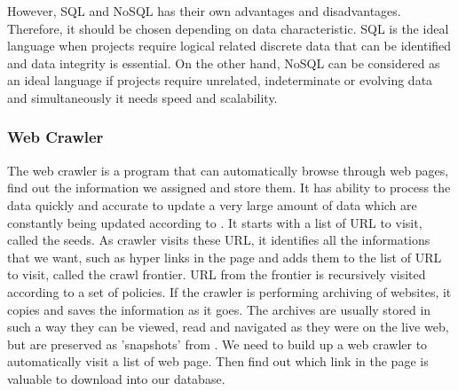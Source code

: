 However, SQL and NoSQL has their own advantages and disadvantages.
Therefore, it should be chosen depending on data characteristic.
SQL is the ideal language when projects require logical related discrete data that can be identified and data integrity is essential.
On the other hand, NoSQL can be considered as an ideal language if projects require unrelated, indeterminate or evolving data and simultaneously it needs speed and scalability.
	
\subsubsection{Web Crawler}
The web crawler is a program that can automatically browse through web pages, find out the information we assigned and store them.
It has ability to process the data quickly and accurate to update a very large amount of data which are constantly being updated according to \cite{Liu2012}.
It starts with a list of URL to visit, called the seeds.
As crawler visits these URL, it identifies all the informations that we want, such as hyper links in the page and adds them to the list of URL to visit, called the crawl frontier.
URL from the frontier is recursively visited according to a set of policies.
If the crawler is performing archiving of websites, it copies and saves the information as it goes.
The archives are usually stored in such a way they can be viewed, read and navigated as they were on the live web, but are preserved as 'snapshots' from \cite{Du2013}.
We need to build up a web crawler to automatically visit a list of web page.
Then find out which link in the page is valuable to download into our database.

\newpage %
